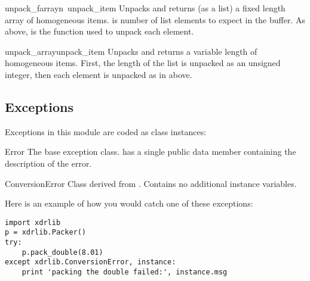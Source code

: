 \begin{funcdesc}{unpack_farray}{n\, unpack_item}
Unpacks and returns (as a list) a fixed length array of homogeneous
items.   is number of list elements to expect in the buffer.
As above,  is the function used to unpack each element.
\end{funcdesc}

\begin{funcdesc}{unpack_array}{unpack_item}
Unpacks and returns a variable length  of homogeneous items.
First, the length of the list is unpacked as an unsigned integer, then
each element is unpacked as in  above.
\end{funcdesc}

\subsection{Exceptions}

Exceptions in this module are coded as class instances:

\begin{excdesc}{Error}
The base exception class.   has a single public data
member  containing the description of the error.
\end{excdesc}

\begin{excdesc}{ConversionError}
Class derived from .  Contains no additional instance
variables.
\end{excdesc}

Here is an example of how you would catch one of these exceptions:

\begin{verbatim}
import xdrlib
p = xdrlib.Packer()
try:
    p.pack_double(8.01)
except xdrlib.ConversionError, instance:
    print 'packing the double failed:', instance.msg
\end{verbatim}
